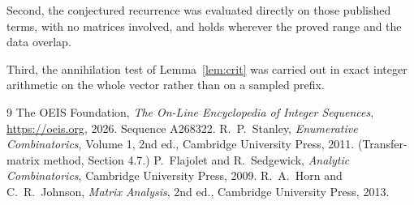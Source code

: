 \documentclass[11pt,a4paper]{article}
\theoremstyle{plain}
\theoremstyle{definition}
\begin{document}
Second, the conjectured recurrence was evaluated directly on those published terms, with no
matrices involved, and holds wherever the proved range and the data overlap.

Third, the annihilation test of Lemma~\ref{lem:crit} was carried out in exact integer
arithmetic on the whole vector rather than on a sampled prefix.

\begin{thebibliography}{9}
 The OEIS Foundation, \emph{The On-Line Encyclopedia of Integer
Sequences}, \url{https://oeis.org}, 2026. Sequence A268322.
 R.~P.~Stanley, \emph{Enumerative Combinatorics}, Volume 1, 2nd ed.,
Cambridge University Press, 2011. (Transfer-matrix method, Section 4.7.)
 P.~Flajolet and R.~Sedgewick, \emph{Analytic Combinatorics}, Cambridge
University Press, 2009.
 R.~A.~Horn and C.~R.~Johnson, \emph{Matrix Analysis}, 2nd ed., Cambridge
University Press, 2013.
\end{thebibliography}
\end{document}
